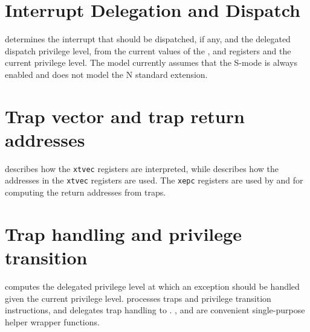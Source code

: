 \section{Interrupt Delegation and Dispatch}
\label{s:priv-sail-intrs}

 determines the interrupt that should be
dispatched, if any, and the delegated dispatch privilege level, from
the current values of the ,  and
 registers and the current privilege level.  The
model currently assumes that the S-mode is always enabled and does not
model the N standard extension.

\begin{formalspec}
  \sailfnfindPendingInterrupt
  \sailtypeinterruptSet
  \sailfnprocessPending
  \sailfngetPendingSet
  \sailfndispatchInterrupt
\end{formalspec}

\section{Trap vector and trap return addresses}
\label{s:priv-sail-tvecs}

 describes how the {\tt xtvec} registers are
interpreted, while  describes how the
addresses in the {\tt xtvec} registers are used. The {\tt xepc}
registers are used by  and
 for computing the return addresses from
traps.

\begin{formalspec}
  \sailfnprepareTrapVector
  \sailfngetXretTarget
  \sailfnsetXretTarget
\end{formalspec}

\section{Trap handling and privilege transition}
\label{s:priv-sail-traps}

 computes the delegated privilege
level at which an exception should be handled given the current
privilege level.   processes traps and
privilege transition instructions, and delegates trap handling to
.  ,
 and  are
convenient single-purpose helper wrapper functions.

